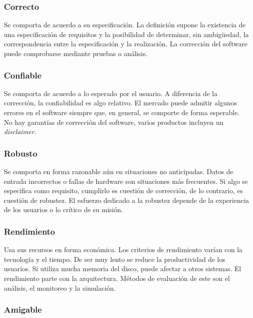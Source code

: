     \subsubsection*{Correcto}
        Se comporta de acuerdo a su especificación. La definición supone la existencia de una especificación de requisitos y la posibilidad de determinar, sin ambigüedad, la correspondencia entre la especificación y la realización. La corrección del software puede comprobarse mediante pruebas o análisis.
        
    \subsubsection*{Confiable}

        Se comporta de acuerdo a lo esperado por el usuario. A diferencia de la corrección, la confiabilidad es algo relativo. El mercado puede admitir algunos errores en el software siempre que, en general, se comporte de forma esperable. No hay garantías de corrección del software, varios productos incluyen un \textit{disclaimer}.
    
    \subsubsection*{Robusto}

        Se comporta en forma razonable aún en situaciones no anticipadas. Datos de entrada incorrectos o fallas de hardware son situaciones más frecuentes. Si algo se especifica como requisito, cumplirlo es cuestión de corrección, de lo contrario, es cuestión de robustez. El esfuerzo dedicado a la robustez depende de la experiencia de los usuarios o lo crítico de su misión. 
    
    \subsubsection*{Rendimiento}

        Usa sus recursos en forma económica. Los criterios de rendimiento varían con la tecnología y el tiempo. De ser muy lento se reduce la productividad de los usuarios. Si utiliza mucha memoria del disco, puede afectar a otros sistemas. El rendimiento parte con la arquitectura. Métodos de evaluación de este son el análisis, el monitoreo y la simulación.
    
    \subsubsection*{Amigable}

